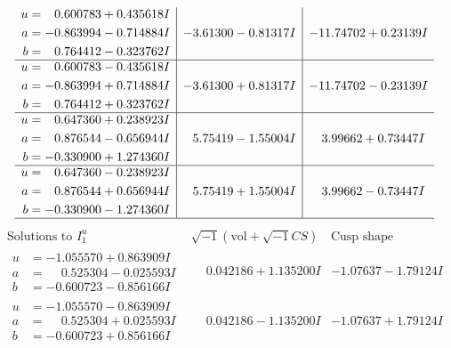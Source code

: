 \documentclass[1p]{elsarticle_modified}
\theoremstyle{definition}
\newcommand{\I}{\sqrt{-1}}
\begin{document}
$$\begin{array}{c|c|c}
\begin{aligned}
u &= \phantom{-}0.600783 + 0.435618 I \\
a &= -0.863994 - 0.714884 I \\
b &= \phantom{-}0.764412 - 0.323762 I\end{aligned}
 & -3.61300 - 0.81317 I & -11.74702 + 0.23139 I \\ \hline\begin{aligned}
u &= \phantom{-}0.600783 - 0.435618 I \\
a &= -0.863994 + 0.714884 I \\
b &= \phantom{-}0.764412 + 0.323762 I\end{aligned}
 & -3.61300 + 0.81317 I & -11.74702 - 0.23139 I \\ \hline\begin{aligned}
u &= \phantom{-}0.647360 + 0.238923 I \\
a &= \phantom{-}0.876544 - 0.656944 I \\
b &= -0.330900 + 1.274360 I\end{aligned}
 & \phantom{-}5.75419 - 1.55004 I & \phantom{-}3.99662 + 0.73447 I \\ \hline\begin{aligned}
u &= \phantom{-}0.647360 - 0.238923 I \\
a &= \phantom{-}0.876544 + 0.656944 I \\
b &= -0.330900 - 1.274360 I\end{aligned}
 & \phantom{-}5.75419 + 1.55004 I & \phantom{-}3.99662 - 0.73447 I\\
 \hline 
 \end{array}$$\newpage$$\begin{array}{c|c|c}  
\text{Solutions to }I^u_{1}& \I (\text{vol} + \sqrt{-1}CS) & \text{Cusp shape}\\
 \hline 
\begin{aligned}
u &= -1.055570 + 0.863909 I \\
a &= \phantom{-}0.525304 - 0.025593 I \\
b &= -0.600723 - 0.856166 I\end{aligned}
 & \phantom{-}0.042186 + 1.135200 I & -1.07637 - 1.79124 I \\ \hline\begin{aligned}
u &= -1.055570 - 0.863909 I \\
a &= \phantom{-}0.525304 + 0.025593 I \\
b &= -0.600723 + 0.856166 I\end{aligned}
 & \phantom{-}0.042186 - 1.135200 I & -1.07637 + 1.79124 I \\ \hline\begin{aligned}

\end{aligned}
\end{array}$$
\end{document}
